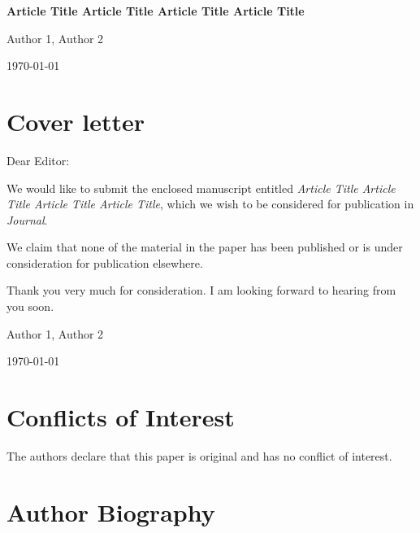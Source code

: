 \documentclass[review, 12pt]{elsarticle}
\def\myauthor{Author 1, Author 2} %
\def\mytitle{Article Title Article Title Article Title Article Title} %
\def\mydate{\today} %
\def\myjournal{Journal} %
\begin{document}
\begin{titlepage}
  \begin{center}
    {\Large \textbf{\mytitle}}
    \par \vspace{2cm}
    \myauthor
    \par \vspace{13cm}
    \mydate
  \end{center}
\end{titlepage}
\thispagestyle{empty}

\section*{Cover letter}

\begin{tcolorbox}[title = To Editor]
\noindent Dear Editor:

\quad We would like to submit the enclosed manuscript entitled \textit{\mytitle}, which we wish to be considered for publication in \textit{\myjournal}.

\quad We claim that none of the material in the paper has been published or is under consideration for publication elsewhere.

\quad Thank you very much for consideration. I am looking forward to hearing from you soon.

\myauthor

\mydate

\end{tcolorbox}

\newpage
\thispagestyle{empty}

\section*{Conflicts of Interest}

The authors declare that this paper is original and has no conflict of interest.

\newpage
\thispagestyle{empty}

\section*{Author Biography}




\end{document}
